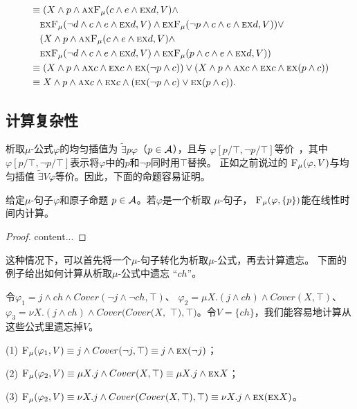 \begin{example}
\begin{align*}
		& \equiv (X \wedge p \wedge \textsc{a}\textsc{x}{\textsc{F}_{\textsc{$\mu$}}}(c \wedge e \wedge \textsc{e}\textsc{x} d, V) \wedge\\
		& \quad\textsc{e}\textsc{x}{\textsc{F}_{\textsc{$\mu$}}}(\neg d \wedge c \wedge e \wedge \textsc{e}\textsc{x} d, V) \wedge  \textsc{e}\textsc{x}{\textsc{F}_{\textsc{$\mu$}}}(\neg p \wedge c \wedge e \wedge \textsc{e}\textsc{x} d, V) )\vee \\
		& \quad (X \wedge p \wedge \textsc{a}\textsc{x}{\textsc{F}_{\textsc{$\mu$}}}(c \wedge e \wedge \textsc{e}\textsc{x} d, V) \wedge\\
		& \quad\textsc{e}\textsc{x}{\textsc{F}_{\textsc{$\mu$}}}(\neg d \wedge c \wedge e \wedge \textsc{e}\textsc{x} d, V) \wedge  \textsc{e}\textsc{x}{\textsc{F}_{\textsc{$\mu$}}}( p \wedge c \wedge e \wedge \textsc{e}\textsc{x} d, V)) \\
		& \equiv (X \wedge p \wedge \textsc{a}\textsc{x} c \wedge \textsc{e}\textsc{x} c \wedge \textsc{e}\textsc{x} (\neg p \wedge c)) \vee 
		(X \wedge p \wedge \textsc{a}\textsc{x} c \wedge \textsc{e}\textsc{x} c \wedge \textsc{e}\textsc{x} (p \wedge c)) \\
		& \equiv X \wedge p \wedge \textsc{a}\textsc{x} c \wedge \textsc{e}\textsc{x} c \wedge (\textsc{e}\textsc{x} (\neg p \wedge c) \vee \textsc{e}\textsc{x} (p \wedge c)).
	\end{align*}
\end{example}

\subsection{计算复杂性}
析取$\mu$-公式$\varphi$的均匀插值为 $\widetilde{\exists}p \varphi$（$p\in {\cal A}$），且与 $\varphi[p/\top,\neg p/\top]$等价~\cite{d2006modal}，其中$\varphi[p/\top,\neg p/\top]$表示将$\varphi$中的$p$和$\neg p$同时用$\top$替换。
正如之前说过的 ${\textsc{F}_{\textsc{$\mu$}}}(\varphi, V)$与均匀插值 $\widetilde{\exists}V \varphi$等价\cite{d2006modal}。因此，下面的命题容易证明。
\begin{corollary}\label{pro:disLiT}
	给定$\mu$-句子$\varphi$和原子命题 $p\in {\cal A}$。若$\varphi$是一个析取 $\mu$-句子， ${\textsc{F}_{\textsc{$\mu$}}}(\varphi, \{p\})$能在线性时间内计算。
\end{corollary}
\begin{proof}
	content...
\end{proof}

这种情况下，可以首先将一个$\mu$-句子转化为析取$\mu$-公式，再去计算遗忘。
下面的例子给出如何计算从析取$\mu$-公式中遗忘 “$ch$”。
\begin{example}
	令$\varphi_1=  j \wedge ch \wedge Cover(\neg j \wedge \neg ch, \top)$、 $\varphi_2= \mu X. (j \wedge ch) \wedge Cover(X, \top)$、 $\varphi_3=  \nu X. (j \wedge ch) \wedge Cover(Cover(X,$ $\top), \top)$。令$V=\{ch\}$，我们能容易地计算从这些公式里遗忘掉$V$。
	
	(1) ${\textsc{F}_{\textsc{$\mu$}}}(\varphi_1, V) \equiv j \wedge Cover(\neg j, \top) \equiv j \wedge \textsc{e} \textsc{x}(\neg j)$；
	
	(2) ${\textsc{F}_{\textsc{$\mu$}}}(\varphi_2, V) \equiv \mu X. j  \wedge Cover(X, \top) \equiv \mu X. j \wedge \textsc{e} \textsc{x} X$；
	
	(3) ${\textsc{F}_{\textsc{$\mu$}}}(\varphi_2, V) \equiv \nu X. j \wedge Cover(Cover(X, \top), \top) \equiv \nu X. j \wedge \textsc{e} \textsc{x}(\textsc{e} \textsc{x} X)$。
\end{example}

